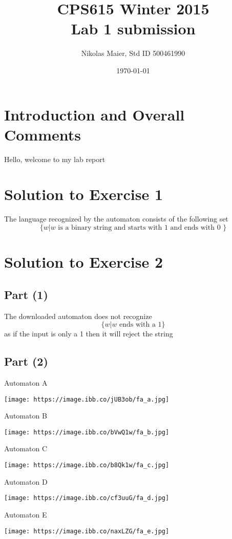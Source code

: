 \documentclass[11pt, fleqn]{article}
\title{CPS615 Winter 2015\\Lab 1 submission}
\author{Nikolas Maier, Std ID 500461990}
\date{\today}
\begin{document}
\maketitle
\section{Introduction and Overall Comments}
Hello, welcome to my lab report 

\section*{Solution to Exercise 1}

The language recognized by the automaton consists of the following set 
\[
\{w|w \mbox{ is a binary string and starts with 1 and ends with 0 }\}
\]

\section*{Solution to Exercise 2}

\subsection*{Part (1)}
The downloaded automaton does not recognize 
\[
\{w|w \mbox{ ends with a 1}\}
\]
as if the input is only a 1 then it will reject the string

\subsection*{Part (2)}
Automaton A 

\texttt{[image: https://image.ibb.co/jUB3ob/fa\_a.jpg]}

\pagebreak

Automaton B 

\texttt{[image: https://image.ibb.co/bVwQ1w/fa\_b.jpg]}

Automaton C

\texttt{[image: https://image.ibb.co/b8Qk1w/fa\_c.jpg]}

Automaton D

\texttt{[image: https://image.ibb.co/cf3uuG/fa\_d.jpg]}

\pagebreak
Automaton E

\texttt{[image: https://image.ibb.co/naxLZG/fa\_e.jpg]}
\end{document}
